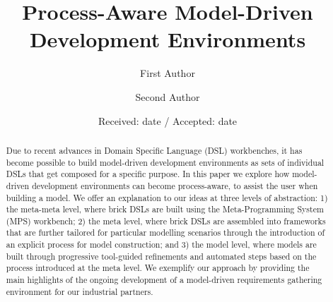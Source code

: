 \usepackage[linewidth=1pt]{mdframed}
\usepackage{lipsum}  

\newcommand\levi[1]{\nb{Levi}{\textcolor{teal}{#1}}}
\newcommand\moussa[1]{\nb{Moussa}{\textcolor{blue}{#1}}}
\newcommand\adrien[1]{\nb{Adrien}{\textcolor{red}{#1}}}



\usepackage[font={small}]{caption, subfig}

% 


\title{Process-Aware Model-Driven Development Environments}


\author{First Author         \and
        Second Author %
}



\date{Received: date / Accepted: date}


\maketitle

\begin{abstract}
Due to recent advances in Domain Specific Language (DSL) workbenches,
it has become possible to build model-driven development environments
as sets of individual DSLs that get composed for a specific purpose. In
this paper we explore how model-driven development environments can become
process-aware, to assist the user when building a model. We offer an
explanation to our ideas at three levels of abstraction: 1) the meta-meta level,
where brick DSLs are built using the Meta-Programming System (MPS) workbench;
2) the meta level, where brick DSLs are assembled into frameworks that
are further tailored for particular modelling scenarios through the introduction
of an explicit process for model construction; and 3) the model level, where
models are built through progressive tool-guided refinements and automated
steps based on the process introduced at the meta level. We exemplify our
approach by providing the main highlights of the ongoing development of a
model-driven requirements gathering environment for our industrial partners.
\levi{abstract from workshop paper, needs to be rewritten}
\end{abstract}

